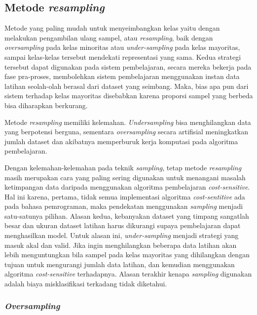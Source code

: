 \subsection{Metode \textit{resampling}}\label{subsec:metode-resampling}

Metode yang paling mudah untuk menyeimbangkan kelas yaitu dengan melakukan pengambilan ulang sampel, atau \textit{resampling}, baik dengan \textit{oversampling} pada kelas minoritas atau \textit{under-sampling} pada kelas mayoritas, sampai kelas-kelas tersebut mendekati representasi yang sama.
Kedua strategi tersebut dapat digunakan pada sistem pembelajaran, secara mereka bekerja pada fase pra-proses, membolehkan sistem pembelajaran menggunakan instan data latihan seolah-olah berasal dari dataset yang seimbang.
Maka, bias apa pun dari sistem terhadap kelas mayoritas disebabkan karena proporsi sampel yang berbeda bisa diharapkan berkurang.

Metode \textit{resampling} memiliki kelemahan.
\textit{Undersampling} bisa menghilangkan data yang berpotensi berguna, sementara \textit{oversampling} secara artifisial meningkatkan jumlah dataset dan akibatnya memperburuk kerja komputasi pada algoritma pembelajaran.

Dengan kelemahan-kelemahan pada teknik \textit{sampling}, tetap metode \textit{resampling} masih merupakan cara yang paling sering digunakan untuk menangani masalah ketimpangan data daripada menggunakan algoritma pembelajaran \textit{cost-sensitive}.
Hal ini karena, pertama, tidak semua implementasi algoritma \textit{cost-sentitive} ada pada bahasa pemrograman, maka pendekatan menggunakan \textit{sampling} menjadi satu-satunya pilihan.
Alasan kedua, kebanyakan dataset yang timpang sangatlah besar dan ukuran dataset latihan harus dikurangi supaya pembelajaran dapat menghasilkan model.
Untuk alasan ini, \textit{under-sampling} menjadi strategi yang masuk akal dan valid.
Jika ingin menghilangkan beberapa data latihan akan lebih menguntungkan bila sampel pada kelas mayoritas yang dihilangkan dengan tujuan untuk mengurangi jumlah data latihan, dan kemudian menggunakan algoritma \textit{cost-sensitive} terhadapnya.
Alasan terakhir kenapa \textit{sampling} digunakan adalah biaya misklasifikasi terkadang tidak diketahui.

\subsubsection{\textit{Oversampling}}\label{subsubsec:oversampling}

